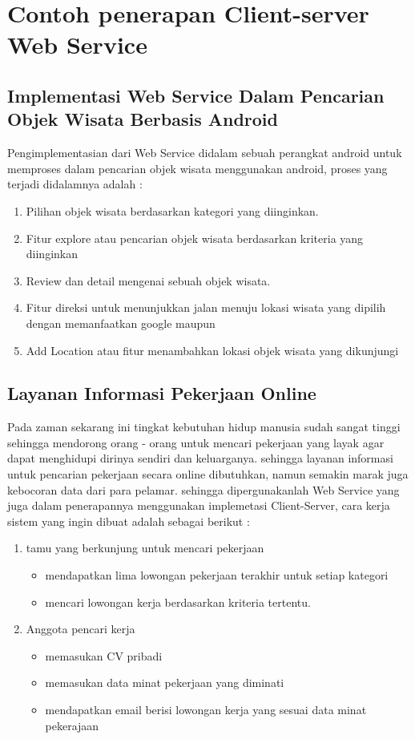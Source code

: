 {\section{Contoh penerapan Client-server Web Service}
\subsection{Implementasi Web Service Dalam Pencarian Objek Wisata Berbasis Android}
Pengimplementasian dari Web Service didalam sebuah perangkat android untuk memproses
dalam pencarian objek wisata menggunakan android, proses yang terjadi didalamnya adalah :

\begin{enumerate}
    \item Pilihan objek wisata berdasarkan kategori yang diinginkan.
    \item Fitur explore atau pencarian objek wisata berdasarkan kriteria yang diinginkan
    \item Review dan detail mengenai sebuah objek wisata.
    \item Fitur direksi untuk menunjukkan jalan menuju lokasi wisata yang dipilih dengan memanfaatkan google maupun
    \item Add Location atau fitur menambahkan lokasi objek wisata yang dikunjungi
\end{enumerate}

\subsection{Layanan Informasi Pekerjaan Online}
Pada zaman sekarang ini tingkat kebutuhan hidup manusia sudah sangat tinggi sehingga mendorong orang - orang
untuk mencari pekerjaan yang layak agar dapat menghidupi dirinya sendiri dan keluarganya. sehingga 
layanan informasi untuk pencarian pekerjaan secara online dibutuhkan, namun semakin marak juga kebocoran
data dari para pelamar. sehingga dipergunakanlah Web Service yang juga dalam penerapannya menggunakan
implemetasi Client-Server, cara kerja sistem yang ingin dibuat adalah sebagai berikut :

\begin{enumerate}
    \item tamu yang berkunjung untuk mencari pekerjaan 
    \begin{itemize}
        \item mendapatkan lima lowongan pekerjaan terakhir untuk setiap kategori
        \item mencari lowongan kerja berdasarkan kriteria tertentu.
    \end{itemize}
    \item Anggota pencari kerja
    \begin{itemize}
        \item memasukan CV pribadi
        \item memasukan data minat pekerjaan yang diminati
        \item mendapatkan email berisi lowongan kerja yang sesuai data minat pekerajaan
    \end{itemize}
\end{enumerate}

}
